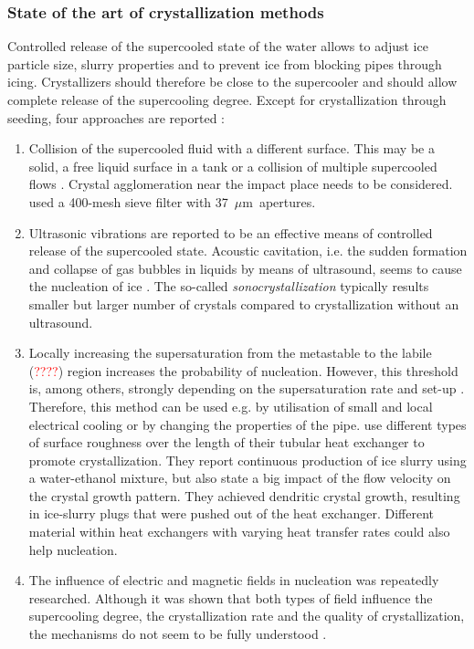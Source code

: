 \subsubsection{State of the art of crystallization methods}
Controlled release of the supercooled state of the water allows to adjust ice particle size, slurry properties and to prevent ice from blocking pipes through icing. Crystallizers should therefore be close to the supercooler and should allow complete release of the supercooling degree. Except for crystallization through seeding, four approaches are reported \citep{wang_investigation_2016, zhang_overview_2012}:

\begin{enumerate}
  \item Collision of the supercooled fluid with a different surface. This may be a solid, a free liquid surface in a tank or a collision of multiple supercooled flows \citep{bedecarrats_ice_2010}. Crystal agglomeration near the impact place needs to be considered. \cite{wang_investigation_2016} used a 400-mesh sieve filter with \SI{37}{$\mu$m} apertures.  
  \item Ultrasonic vibrations are reported to be an effective means of controlled release of the supercooled state. Acoustic cavitation, i.e. the sudden formation and collapse of gas bubbles in liquids by means of ultrasound, seems to cause the nucleation of ice \citep{baillon_28_2015}. The so-called \emph{sonocrystallization} typically results smaller but larger number of crystals compared to crystallization without an ultrasound. 
  \item Locally increasing the supersaturation from the metastable to the labile (\textcolor{red}{????}) region increases the probability of nucleation. However, this threshold is, among others, strongly depending on the supersaturation rate and set-up \citep{mullin_crystallization_2001}. Therefore, this method can be used e.g. by utilisation of small and local electrical cooling or by changing the properties of the pipe. \cite{le_bail_ice_2015} use different types of surface roughness over the length of their tubular heat exchanger to promote crystallization. They report continuous production of ice slurry using a water-ethanol mixture, but also state a big impact of the flow velocity on the crystal growth pattern. They achieved dendritic crystal growth, resulting in ice-slurry plugs that were pushed out of the heat exchanger. Different material within heat exchangers with varying heat transfer rates could also help nucleation.
  \item The influence of electric and magnetic fields in nucleation was repeatedly researched. Although it was shown that both types of field influence the supercooling degree, the crystallization rate and the quality of crystallization, the mechanisms do not seem to be fully understood \citep{dalvi-isfahan_review_2017}.
\end{enumerate}


